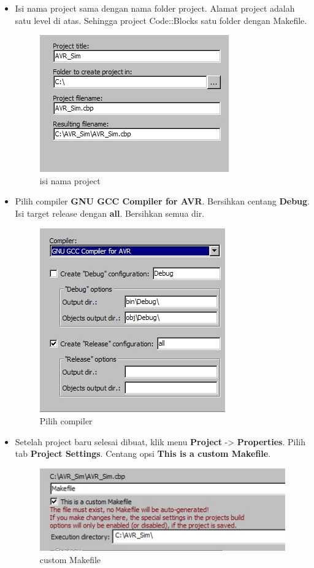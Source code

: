 \documentclass[12pt,]{article}
\begin{document}
\begin{itemize}
		\item Isi nama project sama dengan nama folder project.
		Alamat project adalah satu level di atas.
		Sehingga project Code::Blocks satu folder dengan Makefile.
		\begin{figure}[H]
			\centering
			\includegraphics[width=0.5\linewidth]{images/hello_a3}
			\caption{isi nama project}
		\end{figure}

		\newpage
		\item Pilih compiler \textbf{GNU GCC Compiler for AVR}.
		Bersihkan centang \textbf{Debug}.
		Isi target release dengan \textbf{all}.
		Bersihkan semua dir.
		\begin{figure}[H]
			\centering
			\includegraphics[width=0.5\linewidth]{images/hello_a4}
			\caption{Pilih compiler}
		\end{figure}

		\item Setelah project baru selesai dibuat, klik menu \textbf{Project} -> \textbf{Properties}.
		Pilih tab \textbf{Project Settings}.
		Centang opsi \textbf{This is a custom Makefile}.
		\begin{figure}[H]
			\centering
			\includegraphics[width=0.5\linewidth]{images/hello_a5}
			\caption{custom Makefile}
		\end{figure}


\end{itemize}
\end{document}
